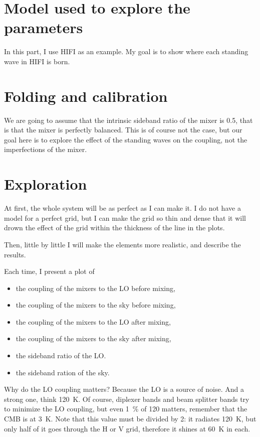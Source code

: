 \section{Model used to explore the parameters}
In this part, I use HIFI as an example.
My goal is to show where each standing wave in HIFI is born.

\begin{figure}
    \centering
\end{figure}

\section{Folding and calibration}

We are going to assume that the intrinsic sideband ratio of the mixer is 0.5, that is that the mixer is perfectly balanced.  This is of course not the case, but our goal here is to explore the effect of the standing waves on the coupling, not the imperfections of the mixer.

\section{Exploration}

At first, the whole system will be as perfect as I can make it.  I do not have a model for a perfect grid, but I can make the grid so thin and dense that it will drown the effect of the grid within the thickness of the line in the plots.

Then, little by little I will make the elements more realistic, and describe the results.

Each time, I present a plot of
\begin{itemize}
    \item the coupling of the mixers to the LO before mixing,
    \item the coupling of the mixers to the sky before mixing,
    \item the coupling of the mixers to the LO after mixing,
    \item the coupling of the mixers to the sky after mixing,
    \item the sideband ratio of the LO.
    \item the sideband ration of the sky.
\end{itemize}

Why do the LO coupling matters?
Because the LO is a source of noise.
And a strong one, think \SI{120}{\kelvin}.
Of course, diplexer bands and beam splitter bands try to minimize the LO coupling, but even \SI{1}{\percent} of \si{120}{\kelvin} matters, remember that the CMB is at \SI{3}{\kelvin}.
Note that this value must be divided by 2: it radiates \SI{120}{\kelvin}, but only half of it goes through the H or V grid, therefore it shines at \SI{60}{\kelvin} in each.



